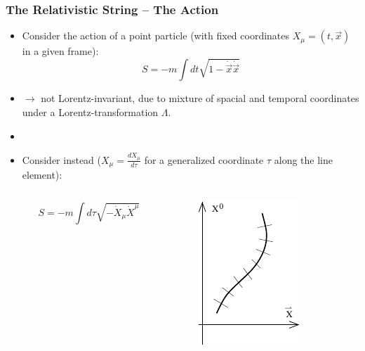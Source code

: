 \documentclass[aspectratio=169]{beamer}
\begin{document}
	\begin{frame}
		\frametitle{The Relativistic String -- The Action}
		\begin{itemize}[]
			\item<1-> Consider the action of a point particle (with fixed coordinates $X_\mu = (t,\vec{x})$ in a given frame):
			\begin{equation*}
				S = -m \int dt \sqrt{1-\dot{\vec{x}}\dot{\vec{x}}}
			\end{equation*}
			\item<1->[] $\rightarrow$ not Lorentz-invariant, due to mixture of spacial and temporal coordinates under a Lorentz-transformation $\Lambda$.
			\item[]
			\item<2-> Consider instead ($X_\mu = \frac{dX_\mu}{d\tau}$ for a generalized coordinate $\tau$ along the line element):
			\begin{columns}
				\begin{column}{0.8\textwidth}
					\begin{equation*}
						S = -m \int d\tau \sqrt{-\dot{X}_\mu\dot{X}^\mu}
					\end{equation*}
				\end{column}
				\begin{column}{0.2\textwidth}
					\begin{figure}
						\includegraphics[width=0.5\linewidth]{res/TongP17_graph}
						\caption{\cite{tong_lectures_2012}}
					\end{figure}
				\end{column}
			\end{columns}
		\end{itemize}
	\end{frame}
	
\end{document}
